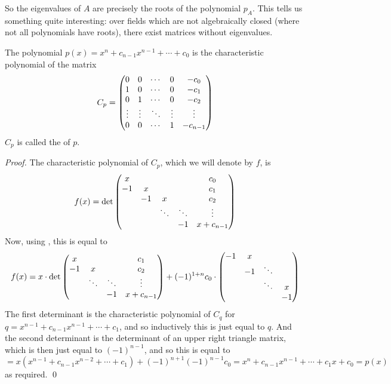 So the eigenvalues of $A$ are precisely the roots of the polynomial $p_A$.
This tells us something quite interesting: over fields which are not algebraically closed (where not all polynomials have roots), there exist matrices without eigenvalues.

\begin{prop*}

    The polynomial $p(x)=x^n+c_{n-1}x^{n-1}+\cdots+c_0$ is the characteristic polynomial of the matrix
    \[ C_p = \begin{pmatrix}0 & 0 & \cdots & 0 & -c_0 \\ 1 & 0 & \cdots & 0 & -c_1 \\ 0 & 1 & \cdots & 0 & -c_2 \\ \vdots & \vdots & \ddots & \vdots & \vdots \\ 0 & 0 & \cdots & 1 & -c_{n-1}\end{pmatrix} \]
    $C_p$ is called the  of $p$.

\end{prop*}

\begin{proof}

    The characteristic polynomial of $C_p$, which we will denote by $f$, is
    \[ f(x) = \det\begin{pmatrix}
        x  &    &   & & c_0 \\
        -1 & x  &   & & c_1 \\
           & -1 & x & & c_2 \\
           &    & \ddots & \ddots & \vdots \\
           &    &   & -1 & x+c_{n-1}\end{pmatrix} \]
    Now, using , this is equal to
    \[ f(x) = x\cdot\det\begin{pmatrix}x & & & c_1 \\ -1 & x & & c_2 \\ & \ddots & \ddots & \vdots \\ & & -1 & x+c_{n-1}\end{pmatrix} +
        (-1)^{1+n}c_0\cdot\begin{pmatrix}-1 & x \\ & -1 & \ddots \\ & & \ddots & x \\ & & & -1\end{pmatrix} \]
    The first determinant is the characteristic polynomial of $C_q$ for $q=x^{n-1}+c_{n-1}x^{n-1}+\cdots+c_1$, and so inductively this is just equal to $q$.
    And the second determinant is the determinant of an upper right triangle matrix, which is then just equal to $(-1)^{n-1}$, and so this is equal to
    \[ = x(x^{n-1}+c_{n-1}x^{n-2}+\cdots+c_1) + (-1)^{n+1}(-1)^{n-1}c_0 = x^n+c_{n-1}x^{n-1} + \cdots + c_1x + c_0 = p(x) \]
    as required.
    \qed

\end{proof}

